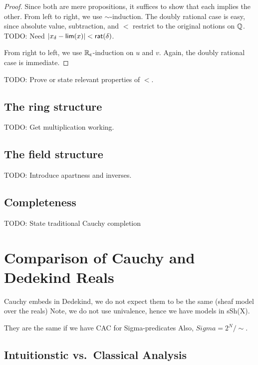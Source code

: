 \begin{proof}
  Since both are mere propositions, it suffices to show that each implies the other.
  From left to right, we use $\sim$-induction.
  The doubly rational case is easy, since absolute value, subtraction, and $<$ restrict to the original notions on $\mathbb{Q}$.
  TODO: Need $|x_\delta - \mathsf{lim}(x)|<\mathsf{rat}(\delta)$.

  From right to left, we use $\mathbb{R}_\mathsf{c}$-induction on $u$ and $v$.
  Again, the doubly rational case is immediate.
\end{proof}

TODO: Prove or state relevant properties of $<$.

\subsection{The ring structure}
\label{sec:ring-structure}

TODO: Get multiplication working.

\subsection{The field structure}
\label{sec:field-structure}

TODO: Introduce apartness and inverses.

\subsection{Completeness}
\label{sec:completeness-RC}

TODO: State traditional Cauchy completion



\section{Comparison of Cauchy and Dedekind Reals}
\label{sec:comp-cacuhy-dedek}

Cauchy embeds in Dedekind, we do not expect them to be the same (sheaf model over the
reals) Note, we do not use univalence, hence we have models in sSh(X).

They are the same if we have CAC for Sigma-predicates
Also, $Sigma = 2^N/\sim$.


\subsection{Intuitionstic vs.\ Classical Analysis}
\label{sec:intuitionistic-vs-classical-analysis}

